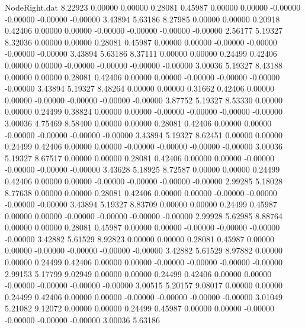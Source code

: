 \begin{filecontents}{NodeRight.dat}
   8.22923    0.00000    0.00000     0.28081    0.45987    0.00000    0.00000   -0.00000   -0.00000   -0.00000   -0.00000    3.43894    5.63186
   8.27985    0.00000    0.00000     0.20918    0.42406    0.00000    0.00000   -0.00000   -0.00000   -0.00000   -0.00000    2.56177    5.19327
   8.32036    0.00000    0.00000     0.28081    0.45987    0.00000    0.00000   -0.00000   -0.00000   -0.00000   -0.00000    3.43894    5.63186
   8.37111    0.00000    0.00000     0.24499    0.42406    0.00000    0.00000   -0.00000   -0.00000   -0.00000   -0.00000    3.00036    5.19327
   8.43188    0.00000    0.00000     0.28081    0.42406    0.00000    0.00000   -0.00000   -0.00000   -0.00000   -0.00000    3.43894    5.19327
   8.48264    0.00000    0.00000     0.31662    0.42406    0.00000    0.00000   -0.00000   -0.00000   -0.00000   -0.00000    3.87752    5.19327
   8.53330    0.00000    0.00000     0.24499    0.38824    0.00000    0.00000   -0.00000   -0.00000   -0.00000   -0.00000    3.00036    4.75469
   8.58400    0.00000    0.00000     0.28081    0.42406    0.00000    0.00000   -0.00000   -0.00000   -0.00000   -0.00000    3.43894    5.19327
   8.62451    0.00000    0.00000     0.24499    0.42406    0.00000    0.00000   -0.00000   -0.00000   -0.00000   -0.00000    3.00036    5.19327
   8.67517    0.00000    0.00000     0.28081    0.42406    0.00000    0.00000   -0.00000   -0.00000   -0.00000   -0.00000    3.43628    5.18925
   8.72587    0.00000    0.00000     0.24499    0.42406    0.00000    0.00000   -0.00000   -0.00000   -0.00000   -0.00000    2.99285    5.18028
   8.77638    0.00000    0.00000     0.28081    0.42406    0.00000    0.00000   -0.00000   -0.00000   -0.00000   -0.00000    3.43894    5.19327
   8.83709    0.00000    0.00000     0.24499    0.45987    0.00000    0.00000   -0.00000   -0.00000   -0.00000   -0.00000    2.99928    5.62985
   8.88764    0.00000    0.00000     0.28081    0.45987    0.00000    0.00000   -0.00000   -0.00000   -0.00000   -0.00000    3.42882    5.61529
   8.92823    0.00000    0.00000     0.28081    0.45987    0.00000    0.00000   -0.00000   -0.00000   -0.00000   -0.00000    3.42882    5.61529
   8.97882    0.00000    0.00000     0.24499    0.42406    0.00000    0.00000   -0.00000   -0.00000   -0.00000   -0.00000    2.99153    5.17799
   9.02949    0.00000    0.00000     0.24499    0.42406    0.00000    0.00000   -0.00000   -0.00000   -0.00000   -0.00000    3.00515    5.20157
   9.08017    0.00000    0.00000     0.24499    0.42406    0.00000    0.00000   -0.00000   -0.00000   -0.00000   -0.00000    3.01049    5.21082
   9.12072    0.00000    0.00000     0.24499    0.45987    0.00000    0.00000   -0.00000   -0.00000   -0.00000   -0.00000    3.00036    5.63186

\end{filecontents}

